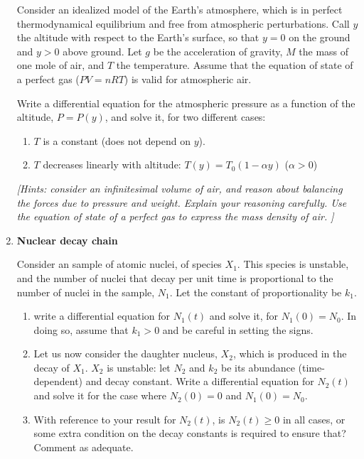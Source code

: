 \documentclass[fleqn]{article}
\begin{document}
\begin{enumerate}
    Consider an idealized model of the Earth's atmosphere, which is in perfect thermodynamical equilibrium and free from atmospheric perturbations.  Call $y$ the altitude with respect to the Earth's surface, so that $y=0$ on the ground and $y>0$ above ground. Let $g$ be the acceleration of gravity, $M$ the mass of one mole of air, and $T$ the temperature. Assume that the  equation of state of a perfect gas ($PV=nRT$) is valid for atmospheric air. 
  
    Write a differential equation for the atmospheric pressure as a function of the altitude, $P=P(y)$, and solve it, for two different cases:
  
    \begin{enumerate}
  
    \item $T$ is a constant (does not depend on $y$).
  
    \item $T$ decreases linearly with altitude: $T(y)=T_0(1-\alpha y)$ ($\alpha>0$)
      
      \end{enumerate}
      
    {\it [Hints: consider an infinitesimal volume of air, and reason about balancing the forces due to pressure and weight. Explain your reasoning carefully. Use the equation of state of a perfect gas to express the mass density of air.  ]}
  
  
  \item {\bf Nuclear decay chain}
  
  
  Consider an sample of atomic nuclei, of species $X_1$. This species is unstable, and the number of nuclei that decay per unit time is proportional to the number of nuclei in the sample, $N_1$. Let the constant of proportionality be $k_1$.     
  
    \begin{enumerate}
  
    \item  write a differential equation for $N_1(t)$ and solve it, for $N_1(0)=N_0$.  In doing so, assume that $k_1>0$ and be careful in setting the signs. 
  
    \item Let us now consider the daughter nucleus, $X_2$, which is produced in the decay of $X_1$. $X_2$ is unstable: let $N_2$ and $k_2$ be its abundance (time-dependent) and decay constant.  Write a differential equation for $N_2(t)$ and solve it for the case where $N_2(0)=0$ and $N_1(0)=N_0$.
  
      \item With reference to your result for $N_2(t)$, is $N_2(t)\geq 0$ in all cases, or some extra condition on the decay constants is required to ensure that?  Comment as adequate.   
      
      \end{enumerate}
  
  \end{enumerate}
\end{document}

